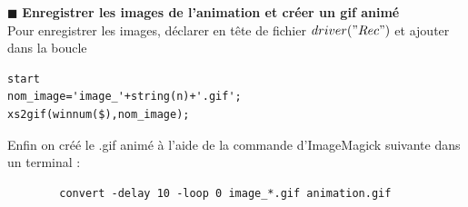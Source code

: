 \documentclass[a4,12pt]{article}
\begin{document}
\hspace{0.5cm} $\blacksquare$ \textbf{Enregistrer les images de l'animation et créer un gif animé}\\

Pour enregistrer les images, déclarer en tête de fichier $driver("Rec")$ et ajouter dans la boucle

\begin{lstlisting}[frame=single,caption=Enregistrer des images sous Scilab]  
start
nom_image='image_'+string(n)+'.gif'; 
xs2gif(winnum($),nom_image);
\end{lstlisting}

Enfin on créé le .gif animé à l'aide de la commande d'ImageMagick suivante dans un terminal : 
\begin{center}
	\begin{verbatim}
		convert -delay 10 -loop 0 image_*.gif animation.gif
	\end{verbatim}
\end{center}
 
\end{document}
